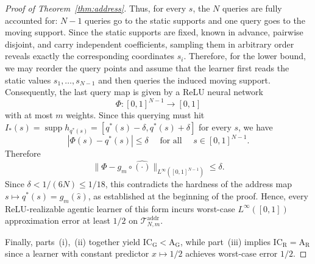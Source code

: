 \documentclass[10pt,a4paper]{amsart}
\newcommand{\AG}{\mathrm{A_G}}
\newcommand{\AR}{\mathrm{A_R}}
\newcommand{\ICG}{\mathrm{IC_G}}
\newcommand{\ICR}{\mathrm{IC_R}}
\begin{document}
\begin{proof}[Proof of Theorem~\ref{thm:address}]
Thus, for every \(s\), the \(N\) queries are fully accounted for: \(N-1\) queries go to the static supports and one query goes to the moving support. Since the static supports are fixed, known in advance, pairwise disjoint, and carry independent coefficients, sampling them in arbitrary order reveals exactly the corresponding coordinates \(s_i\).
Therefore, for the lower bound, we may reorder the query points and assume that the learner first reads the static values \(s_1,\dots,s_{N-1}\) and then queries the induced moving support. %
Consequently, the last %
query map is given by a ReLU neural network
\[
\Phi:[0,1]^{N-1}\to[0,1]
\]
with at most \(m\) weights. Since this querying must hit $I_*(s)=\operatorname{supp}h_{q^\ast(s)} = [q^\ast(s)-\delta, q^\ast(s)+\delta]$
for every \(s\), we have
\[
|\Phi(s)-q^\ast(s)|\leq \delta
\quad
\text{ for all }\quad s\in[0,1]^{N-1}.
\]
Therefore
\[
\|\Phi-g_m\circ \widehat{(\cdot)}\|_{L^\infty([0,1]^{N-1})}
\leq \delta.
\]
Since $\delta<1/(6N)\leq 1/18$, this contradicts the hardness of the address map $s\mapsto q^\ast(s)=g_m(\widehat s)$, as established at the beginning of the proof. Hence, every ReLU-realizable agentic learner of this form incurs worst-case \(L^\infty([0,1])\) approximation error at least \(1/2\) on $\mathcal T_{N,m}^{\mathrm{addr}}$.

Finally, parts~(i),~(ii) together yield $\ICG<\AG$, while part~(iii) implies $\ICR = \AR$ since a learner with constant predictor $x\mapsto 1/2$ achieves worst-case error $1/2$.
\end{proof}
\end{document}
